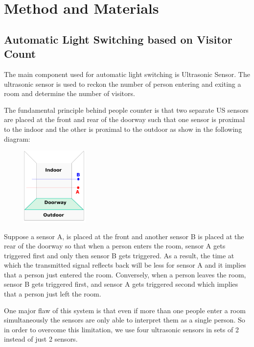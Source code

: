 
\section{Method and Materials}

\subsection{Automatic Light Switching based on Visitor Count}

\begin{multicols}{2}

The main component used for automatic light switching is Ultrasonic
Sensor. The ultrasonic sensor is used to reckon the number of person
entering and exiting a room and determine the number of visitors.

The fundamental principle behind people counter is that two separate
US sensors are placed at the front and rear of the doorway such that
one sensor is proximal to the indoor and the other is proximal to the
outdoor as show in the following diagram:
\begin{figure}[H]
  \centering
  \includegraphics[width=0.3\textwidth]{twoultrasonic.png}
\end{figure}

  Suppose a sensor A, is placed at the front and another sensor B is
  placed at the rear of the doorway so that when a person enters the
  room, sensor A gets triggered first and only then sensor B gets
  triggered.  As a result, the time at which the transmitted signal
  reflects back will be less for sensor A and it implies that a person
  just entered the room. Conversely, when a person leaves the room,
  sensor B gets triggered first, and sensor A gets triggered second
  which implies that a person just left the room.

  One major flaw of this system is that even if more than one people
  enter a room simultaneously the sensors are only able to interpret
  them as a single person. So in order to overcome this limitation, we
  use four ultrasonic sensors in sets of 2 instead of just 2 sensors.


\end{multicols}
